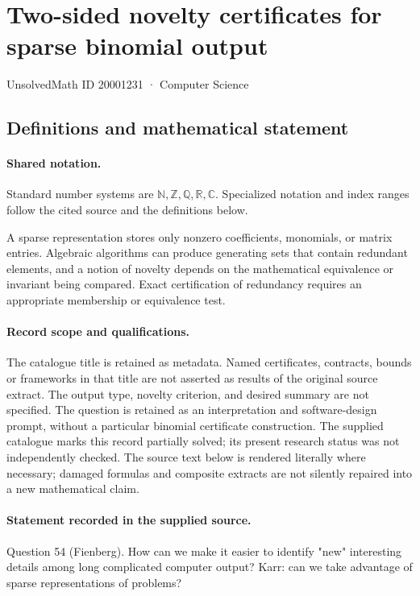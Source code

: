 \documentclass[11pt]{article}
\begin{document}
\setcounter{section}{20001230}
\section{Two-sided novelty certificates for sparse binomial output}\label{20001231}
{\small\sffamily UnsolvedMath ID 20001231 · Computer Science}
\subsection{Definitions and mathematical statement}

\paragraph{Shared notation.}Standard number systems are $\mathbb N,\mathbb Z,\mathbb Q,\mathbb R,\mathbb C$. Specialized notation and index ranges follow the cited source and the definitions below.


A sparse representation stores only nonzero coefficients, monomials, or matrix entries. Algebraic algorithms can produce generating sets that contain redundant elements, and a notion of novelty depends on the mathematical equivalence or invariant being compared. Exact certification of redundancy requires an appropriate membership or equivalence test.
\paragraph{Record scope and qualifications.}
The catalogue title is retained as metadata. Named certificates, contracts, bounds or frameworks in that title are not asserted as results of the original source extract.
The output type, novelty criterion, and desired summary are not specified. The question is retained as an interpretation and software-design prompt, without a particular binomial certificate construction. The supplied catalogue marks this record partially solved; its present research status was not independently checked.
The source text below is rendered literally where necessary; damaged formulas and composite extracts are not silently repaired into a new mathematical claim.
\paragraph{Statement recorded in the supplied source.}
Question 54 (Fienberg). How can we make it easier to identify "new" interesting details among long complicated computer output? Karr: can we take advantage of sparse representations of problems?
\end{document}
